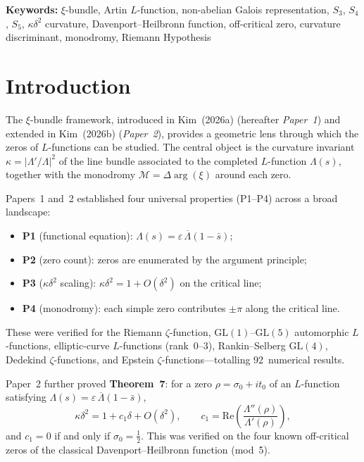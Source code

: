 \documentclass[11pt, a4paper]{article}
\theoremstyle{plain}
\theoremstyle{definition}
\newcommand{\abs}[1]{\left|#1\right|}
\newcommand{\Lam}{\Lambda}             %
\newcommand{\kap}{\kappa}             %
\newcommand{\mono}{\mathcal{M}}       %
\begin{document}
\vspace{0.5em}
\noindent\textbf{Keywords:} $\xi$-bundle, Artin $L$-function,
non-abelian Galois representation, $S_{3}$, $S_{4}$, $S_{5}$,
$\kap\delta^{2}$ curvature, Davenport--Heilbronn function,
off-critical zero, curvature discriminant, monodromy, Riemann Hypothesis

\tableofcontents
\newpage


\section{Introduction}
\label{sec:intro}

The $\xi$-bundle framework, introduced in Kim~(2026a) (hereafter
\textit{Paper~1}) and extended in Kim~(2026b) (\textit{Paper~2}),
provides a geometric lens through which the zeros of $L$-functions can
be studied.  The central object is the curvature invariant
$\kap = \abs{\Lam'/\Lam}^{2}$ of the line bundle associated to the
completed $L$-function $\Lam(s)$, together with the monodromy
$\mono = \Delta\arg(\xi)$ around each zero.

Papers~1 and~2 established four universal properties (P1--P4) across
a broad landscape:
\begin{itemize}
  \item \textbf{P1} (functional equation): $\Lam(s) = \varepsilon\,\overline{\Lam}(1-\bar{s})$;
  \item \textbf{P2} (zero count): zeros are enumerated by the argument principle;
  \item \textbf{P3} ($\kap\delta^{2}$ scaling): $\kap\delta^{2} = 1 + O(\delta^{2})$ on the critical line;
  \item \textbf{P4} (monodromy): each simple zero contributes $\pm\pi$ along the critical line.
\end{itemize}
These were verified for the Riemann $\zeta$-function,
$\mathrm{GL}(1)$--$\mathrm{GL}(5)$ automorphic $L$-functions,
elliptic-curve $L$-functions (rank~0--3), Rankin--Selberg
$\mathrm{GL}(4)$, Dedekind $\zeta$-functions, and Epstein
$\zeta$-functions---totalling 92~numerical results.

Paper~2 further proved \textbf{Theorem~7}: for a zero $\rho = \sigma_{0}+it_{0}$
of an $L$-function satisfying $\Lam(s)=\varepsilon\,\overline{\Lam}(1-\bar{s})$,
\[
  \kap\delta^{2} = 1 + c_{1}\delta + O(\delta^{2}),
  \qquad c_{1} = \mathrm{Re}\!\left(\frac{\Lam''(\rho)}{\Lam'(\rho)}\right),
\]
and $c_{1}=0$ if and only if $\sigma_{0}=\tfrac{1}{2}$.  This was
verified on the four known off-critical zeros of the classical
Davenport--Heilbronn function (mod~5).
\end{document}
